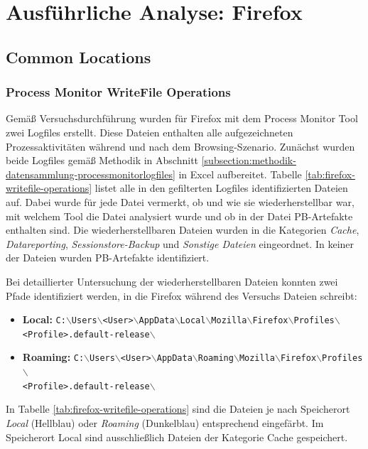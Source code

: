 \begin{appendices}
\begin{landscape}
\end{landscape}
\restoregeometry

\section{Ausführliche Analyse: Firefox}\label{section:appendix-firefox}
\subsection{Common Locations}
\label{subsection:appendix-firefox-common-locations}
\subsubsection*{Process Monitor WriteFile Operations}
\label{subsubsection:appendix-firefox-common-locations-writefile-operations}
Gemäß Versuchsdurchführung wurden für Firefox mit dem Process Monitor Tool zwei Logfiles erstellt. Diese Dateien enthalten alle aufgezeichneten Prozessaktivitäten während und nach dem Browsing-Szenario.
Zunächst wurden beide Logfiles gemäß Methodik in Abschnitt \ref{subsection:methodik-datensammlung-processmonitorlogfiles} in Excel aufbereitet. Tabelle \ref{tab:firefox-writefile-operations} listet alle in den gefilterten Logfiles identifizierten Dateien auf. Dabei wurde für jede Datei vermerkt, ob und wie sie wiederherstellbar war, mit welchem Tool die Datei analysiert wurde und ob in der Datei PB-Artefakte enthalten sind. Die wiederherstellbaren Dateien wurden in die Kategorien \textit{Cache}, \textit{Datareporting}, \textit{Sessionstore-Backup} und \textit{Sonstige Dateien} eingeordnet. In keiner der Dateien wurden PB-Artefakte identifiziert.

Bei detaillierter Untersuchung der wiederherstellbaren Dateien konnten zwei Pfade identifiziert werden, in die Firefox während des Versuchs Dateien schreibt: 
\begin{itemize}
\item \textbf{Local:} \texttt{C:$\backslash$Users$\backslash$<User>$\backslash$AppData$\backslash$Local$\backslash$Mozilla$\backslash$Firefox$\backslash$Profiles$\backslash$\\<Profile>.default-release$\backslash$}
\item \textbf{Roaming:} \texttt{C:$\backslash$Users$\backslash$<User>$\backslash$AppData$\backslash$Roaming$\backslash$Mozilla$\backslash$Firefox$\backslash$Profiles$\backslash$\\<Profile>.default-release$\backslash$}
\end{itemize}
In Tabelle 	\ref{tab:firefox-writefile-operations} sind die Dateien je nach Speicherort \textit{Local} (Hellblau) oder \textit{Roaming} (Dunkelblau) entsprechend eingefärbt. Im Speicherort Local sind ausschließlich Dateien der Kategorie \glqq{}Cache\grqq{} gespeichert.


\end{appendices}
